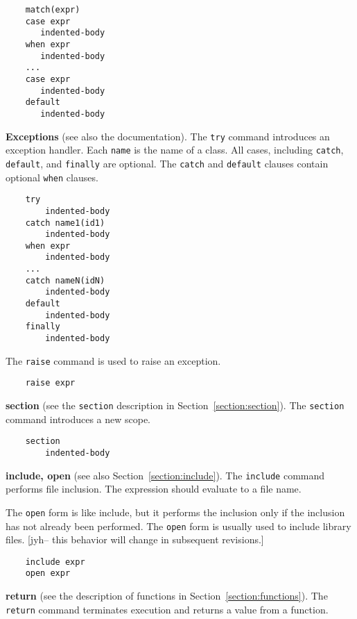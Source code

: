\begin{verbatim}
    match(expr)
    case expr
       indented-body
    when expr
       indented-body
    ...
    case expr
       indented-body
    default
       indented-body
\end{verbatim}

%
\textbf{Exceptions} (see also the  documentation).  The \verb+try+ command
introduces an exception handler.  Each \verb+name+ is the name of a class.  All cases, including
\verb+catch+, \verb+default+, and \verb+finally+ are optional.  The \verb+catch+ and \verb+default+
clauses contain optional \verb+when+ clauses.

\begin{verbatim}
    try
        indented-body
    catch name1(id1)
        indented-body
    when expr
        indented-body
    ...
    catch nameN(idN)
        indented-body
    default
        indented-body
    finally
        indented-body
\end{verbatim}

The \verb+raise+ command is used to raise an exception.

\begin{verbatim}
    raise expr
\end{verbatim}        

%
\textbf{section} (see the \verb+section+ description in Section~\ref{section:section}).  The \verb+section+ command
introduces a new scope.

\begin{verbatim}
    section
        indented-body
\end{verbatim}

%
\textbf{include, open} (see also Section~\ref{section:include}).  The \verb+include+ command
performs file inclusion.  The expression should evaluate to a file name.

The \verb+open+ form is like include, but it performs the inclusion only if the inclusion has not
already been performed.  The \verb+open+ form is usually used to include library files.  [jyh-- this
behavior will change in subsequent revisions.]

\begin{verbatim}
    include expr
    open expr
\end{verbatim}

%
\textbf{return} (see the description of functions in Section~\ref{section:functions}).  The \verb+return+ command
terminates execution and returns a value from a function.

